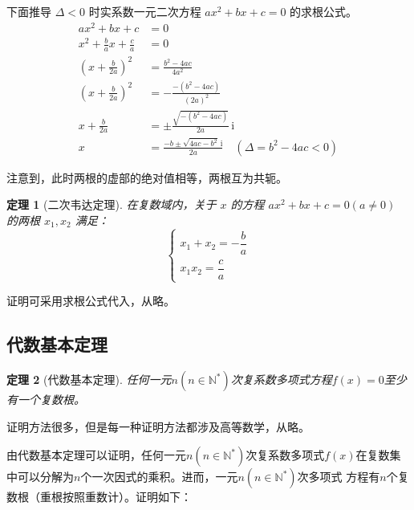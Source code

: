 \documentclass[a4paper,openany]{ctexbook}
\newtheorem{thmlevel1}{定理}
\newcommand{\ii}{\,\mathrm{i}}
\begin{document}
下面推导 \(\varDelta<0\) 时实系数一元二次方程 \(ax^2+bx+c=0\) 的求根公式。
\begin{align*}
    ax^2+bx+c                     & =0                                                             \\
    x^2+\frac{b}{a}x+\frac{c}{a}  & =0                                                             \\
    \left(x+\frac{b}{2a}\right)^2 & =\frac{b^2-4ac}{4a^2}                                          \\
    \left(x+\frac{b}{2a}\right)^2 & =-\frac{-(b^2-4ac)}{(2a)^2}                                    \\
    x+\frac{b}{2a}                & =\pm\frac{\sqrt{-(b^2-4ac)}}{2a}\ii                            \\
    x                             & =\frac{-b\pm\sqrt{4ac-b^2}\ii}{2a} \quad (\varDelta=b^2-4ac<0)
\end{align*}

注意到，此时两根的虚部的绝对值相等，两根互为共轭。

\begin{thmlevel1}[二次韦达定理]\label{thm:erciwwdadkli}
    在复数域内，关于 \(x\) 的方程 \(ax^2+bx+c=0(a\ne 0)\) 的两根 \(x_1,x_2\) 满足：
    \[
        \begin{cases}
            x_1+x_2=-\dfrac{b}{a} \\
            x_1x_2=\dfrac{c}{a}
        \end{cases}
    \]
\end{thmlevel1}

证明可采用求根公式代入，从略。

\subsection{代数基本定理}

\begin{thmlevel1}[代数基本定理]
    任何一元\(n(n\in \mathbb{N^*})\)次复系数多项式方程\(f(x)=0\)至少有一个复数根。
\end{thmlevel1}

证明方法很多，但是每一种证明方法都涉及高等数学，从略。

由代数基本定理可以证明，任何一元\(n(n\in \mathbb{N^*})\)次复系数多项式\(f(x)\)在复数集中可以分解为\(n\)个一次因式的乘积。进而，一元\(n(n\in \mathbb{N^*})\)次多项式
方程有\(n\)个复数根（重根按照重数计）。证明如下：
\end{document}
